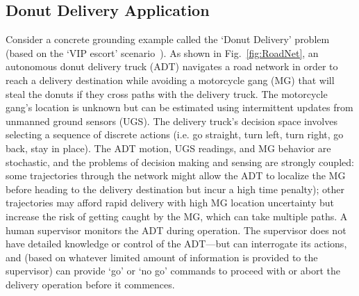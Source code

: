 \subsection{Donut Delivery Application} \label{sec:donut_delivery}
Consider a concrete grounding example called the `Donut Delivery' problem (based on the `VIP escort' scenario~\cite{Humphrey2012-lr}). As shown in Fig.~\ref{fig:RoadNet}, an autonomous donut delivery truck (ADT) navigates a road network in order to reach a delivery destination while avoiding a motorcycle gang (MG) that will steal the donuts if they cross paths with the delivery truck. The motorcycle gang's location is unknown but can be estimated using intermittent updates from unmanned ground sensors (UGS). The delivery truck's decision space involves selecting a sequence of discrete actions (i.e. go straight, turn left, turn right, go back, stay in place). The ADT motion, UGS readings, and MG behavior are stochastic, and the problems of decision making and sensing are strongly coupled: some trajectories through the network might allow the ADT to localize the MG before heading to the delivery destination but incur a high time penalty); other trajectories may afford rapid delivery with high MG location uncertainty but increase the risk of getting caught by the MG, which can take multiple paths. A human supervisor monitors the ADT during operation. The supervisor does not have detailed knowledge or control of the ADT---but can interrogate its actions, and (based on whatever limited amount of information is provided to the supervisor) can provide `go' or `no go' commands to proceed with or abort the delivery operation before it commences. 

